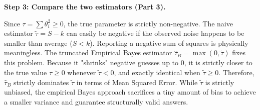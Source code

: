 \begin{solution}
\textbf{Step 3: Compare the two estimators (Part 3).}

Since $\tau = \sum \theta_i^2 \geq 0$, the true parameter is strictly non-negative.
The naive estimator $\tilde{\tau} = S - k$ can easily be negative if the observed noise happens to be smaller than average ($S < k$). Reporting a negative sum of squares is physically meaningless.
The truncated Empirical Bayes estimator $\hat{\tau}_B = \max(0, \tilde{\tau})$ fixes this problem. 
Because it "shrinks" negative guesses up to 0, it is strictly closer to the true value $\tau \geq 0$ whenever $\tilde{\tau} < 0$, and exactly identical when $\tilde{\tau} \geq 0$.
Therefore, $\hat{\tau}_B$ strictly dominates $\tilde{\tau}$ in terms of Mean Squared Error. While $\tilde{\tau}$ is strictly unbiased, the empirical Bayes approach sacrifices a tiny amount of bias to achieve a smaller variance and guarantee structurally valid answers.
\end{solution}
